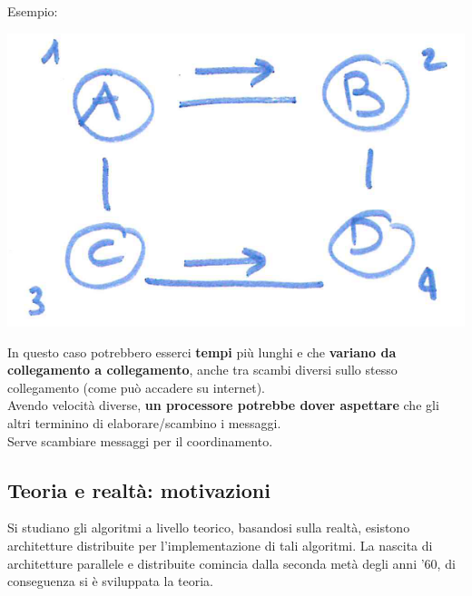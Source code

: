 Esempio: 
\begin{center}
	\includegraphics[width=0.6\columnwidth]{img/somm1}
\end{center}

In questo caso potrebbero esserci \textbf{tempi} più lunghi e che \textbf{variano da collegamento a collegamento}, anche tra scambi diversi sullo stesso collegamento (come può accadere su internet). \\

Avendo velocità diverse, \textbf{un processore potrebbe dover aspettare} che gli altri terminino di elaborare/scambino i messaggi. \\
Serve scambiare messaggi per il coordinamento.\\

\newpage

\subsection*{Teoria e realtà: motivazioni}
Si studiano gli algoritmi a livello teorico, basandosi sulla realtà, esistono architetture distribuite per l'implementazione di tali algoritmi. La nascita di architetture parallele e distribuite comincia dalla seconda metà degli anni '60, di conseguenza si è sviluppata la teoria. \\

